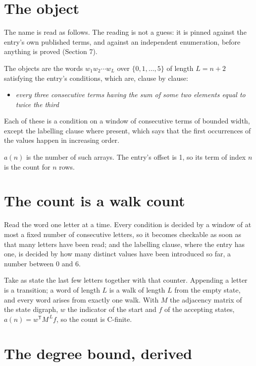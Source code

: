 \documentclass[11pt]{article}
\theoremstyle{definition}
\begin{document}
\section{The object}

The name is read as follows. The reading is not a guess: it is pinned against the entry's own published terms, and against an independent enumeration, before anything is proved (Section 7).

The objects are the words $w_1 w_2 \cdots w_L$ over $\{0,1,\dots,5\}$ of length $L = n + 2$ satisfying the entry's conditions, which are, clause by clause:

\begin{itemize}

\item {\itshape every three consecutive terms having the sum of some two elements equal to twice the third}

\end{itemize}

Each of these is a condition on a window of consecutive terms of bounded width, except the labelling clause where present, which says that the first occurrences of the values happen in increasing order.

$a(n)$ is the number of such arrays. The entry's offset is 1, so its term of index $n$ is the count for $n$ rows.

\section{The count is a walk count}

Read the word one letter at a time. Every condition is decided by a window of at most a fixed number of consecutive letters, so it becomes checkable as soon as that many letters have been read; and the labelling clause, where the entry has one, is decided by how many distinct values have been introduced so far, a number between $0$ and 6.

Take as state the last few letters together with that counter. Appending a letter is a transition; a word of length $L$ is a walk of length $L$ from the empty state, and every word arises from exactly one walk. With $M$ the adjacency matrix of the state digraph, $w$ the indicator of the start and $f$ of the accepting states, $a(n) = w^{\mathsf T}M^{\,L}f$, so the count is C-finite.

\section{The degree bound, derived}
\end{document}
